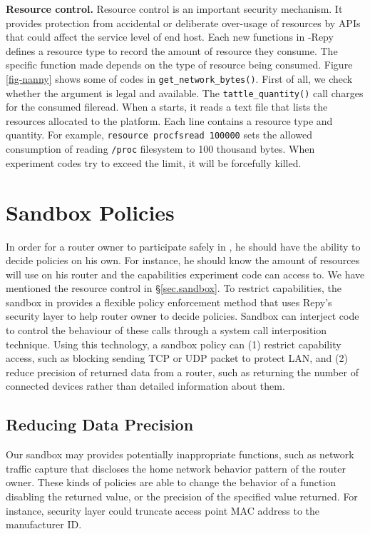 \textbf{Resource control.} Resource control is an important security mechanism. It provides protection from accidental or deliberate over-usage of resources by APIs that could affect the service level of end host. Each new functions in \sysname-Repy defines a resource type to record the amount of resource they consume. The specific function made depends on the type of resource being consumed. Figure \ref{fig-nanny} shows some of codes in \texttt{get\_network\_bytes()}. First of all, we check whether the argument is legal and available. The \texttt{tattle\_quantity()} call charges for the consumed fileread. When a \sysname starts, it reads a text file that lists the resources allocated to the platform. Each line contains a resource type and quantity. For example, \texttt{resource procfsread 100000} sets the allowed consumption of reading \texttt{/proc} filesystem to 100 thousand bytes. When experiment codes try to exceed the limit, it will be forcefully killed.

\section{Sandbox Policies}
\label{sec.policy}
In order for a router owner to participate safely in \sysname, he should have the ability to decide policies on his own. For instance, he should know the amount of resources \sysname will use on his router and the capabilities experiment code can access to. We have mentioned the resource control in \S{\ref{sec.sandbox}}. To restrict capabilities, the sandbox in \sysname provides a flexible policy enforcement method that uses Repy's security layer to help router owner to decide policies. Sandbox can interject code to control the behaviour of these calls through a system call interposition technique. Using this technology, a sandbox policy can (1) restrict capability access, such as blocking sending TCP or UDP packet to protect LAN, and (2) reduce precision of returned data from a router, such as returning the number of connected devices rather than detailed information about them.

\subsection{Reducing Data Precision}
Our sandbox may provides potentially inappropriate functions, such as network traffic capture that discloses the home network behavior pattern of the router owner. These kinds of policies are able to change the behavior of a function disabling the returned value, or the precision of the specified value returned. For instance, security layer could truncate access point MAC address to the manufacturer ID.

